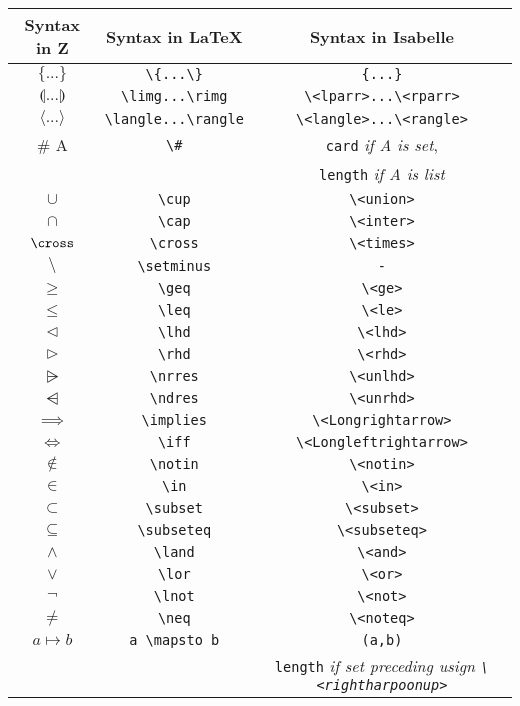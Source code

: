 {\def\arraystretch{0.5}\tabcolsep=0.5pt
\begin{longtable}[H]{|c | c | c |}
\hline
\textbf{Syntax in Z} & \textbf{Syntax in \LaTeX} & \textbf{Syntax in Isabelle} \\
\hline
$\{...\}$ & \verb|\{...\}| & \verb|{...}|\\
$\limg...\rimg$ & \verb|\limg...\rimg| & \verb|\<lparr>...\<rparr>| \\
$\langle...\rangle$ & \verb|\langle...\rangle| & \verb|\<langle>...\<rangle>| \\
$\# $ A & \verb|\#| & \verb|card| \textit{if A is set}, \\
& & \verb|length| \textit{if A is list} \\
$\cup $ & \verb|\cup| & \verb|\<union>| \\
$\cap$ & \verb|\cap| & \verb|\<inter>| \\
$\cross$ & \verb|\cross| & \verb|\<times>| \\
$\setminus$ & \verb|\setminus| & \verb|-| \\
$\geq$ & \verb|\geq| & \verb|\<ge>| \\
$\leq$ & \verb|\leq| & \verb|\<le>| \\
$\lhd$ & \verb|\lhd| & \verb|\<lhd>| \\
$\rhd$ & \verb|\rhd| & \verb|\<rhd>| \\
$\nrres$ & \verb|\nrres| & \verb|\<unlhd>| \\
$\ndres$ & \verb|\ndres| & \verb|\<unrhd>| \\
$\implies$ & \verb|\implies| & \verb|\<Longrightarrow>| \\
$\iff$ & \verb|\iff| & \verb|\<Longleftrightarrow>| \\
$\notin$ & \verb|\notin| & \verb|\<notin>| \\
$\in$ & \verb|\in| & \verb|\<in>| \\
$\subset$ & \verb|\subset| & \verb|\<subset>| \\
$\subseteq$ & \verb|\subseteq| & \verb|\<subseteq>| \\
$\land$ & \verb|\land| & \verb|\<and>| \\
$\lor$ & \verb|\lor| & \verb|\<or>| \\
$\lnot$ & \verb|\lnot| & \verb|\<not>| \\
$\neq$ & \verb|\neq| & \verb|\<noteq>| \\
$a \mapsto b$ & \verb|a \mapsto b| & \verb|(a,b)| \\
& & \verb|length| \textit{if set preceding usign \verb|\<rightharpoonup>|} \\

\end{longtable}}
